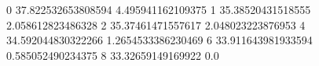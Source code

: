 0 37.822532653808594 4.495941162109375
1 35.38520431518555 2.058612823486328
2 35.37461471557617 2.048023223876953
4 34.592044830322266 1.2654533386230469
6 33.911643981933594 0.585052490234375
8 33.32659149169922 0.0
